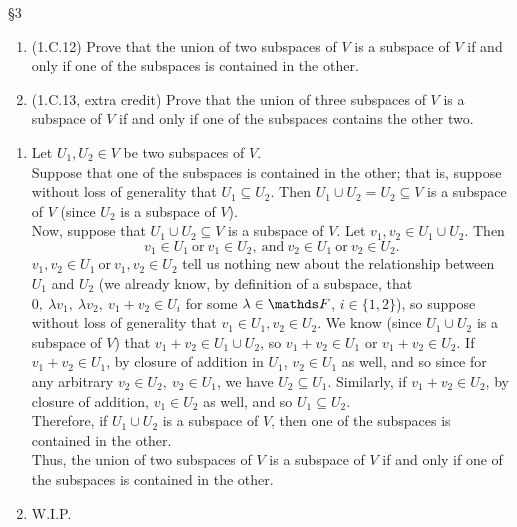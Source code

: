\documentclass{homework}
\begin{document}
\begin{problem}{\S 3}
  \begin{enumerate}[label=(\alph*)]
    \item (1.C.12) Prove that the union of two subspaces of $V$ is a subspace of $V$ if and only if
      one of the subspaces is contained in the other.
    \item (1.C.13, extra credit) Prove that the union of three subspaces of $V$ is a subspace of $V$ 
      if and only if one of the subspaces contains the other two.
  \end{enumerate}
\end{problem}
\begin{solution}
  \begin{enumerate}[label=(\alph*)]
    \item 
  Let $U_1,U_2\in V$ be two subspaces of $V$.\\

  Suppose that one of the subspaces is contained in the other; that is, suppose without loss of
  generality that $ U_1\subseteq U_2$. Then $ U_1\cup U_2=U_2\subseteq V$ is a subspace of $V$ 
  (since $ U_2$ is a subspace of $V$).\\

  Now, suppose that $ U_1\cup U_2\subseteq V$ is a subspace of $V$. Let $ v_1,v_2\in U_1\cup U_2$.
  Then \[
    v_1\in U_1 ~\text{or}~v_1\in U_2,~\text{and}~v_2\in U_1~\text{or}~v_2\in U_2
  .\] $ v_1,v_2\in U_1~\text{or}~v_1,v_2\in U_2$ tell us nothing new about the relationship between
  $ U_1$ and $U_2$ (we already know, by definition of a subspace, that $0,\ \lambda v_1,\ \lambda
  v_2,\ v_1+v_2\in U_i$ for some $\lambda\in \F$, $i\in \{ 1,2 \}$), so suppose without loss of
  generality that $v_1\in U_1,v_2\in U_2$. We know (since $ U_1\cup U_2$ is a subspace of $V$) that
  $v_1+v_2\in U_1\cup U_2$, so $ v_1+v_2\in U_1$ or $ v_1+v_2\in U_2$. If $ v_1+v_2\in U_1$, by
  closure of addition in $ U_1$, $ v_2\in U_1$ as well, and so since for any arbitrary $v_2\in U_2,\
  v_2\in U_1$, we have $ U_2\subseteq U_1$. Similarly, if $ v_1+v_2\in U_2$, by closure of addition, $v_1\in
  U_2$ as well, and so $ U_1\subseteq U_2$. \\
  Therefore, if $ U_1\cup U_2$ is a subspace of $V$, then one of the subspaces is contained in the
  other.\\

  Thus, the union of two subspaces of $V$ is a subspace of $V$ if and only if one of the subspaces
  is contained in the other.

    \item W.I.P.
  \end{enumerate}
\end{solution}
\end{document}

